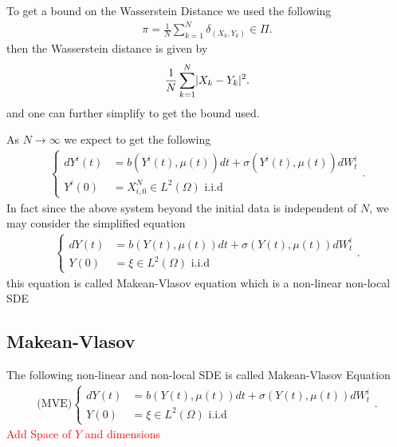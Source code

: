 \begin{remark}
 To get a bound on the Wasserstein Distance we used the following  
  \begin{align*}
    \pi  = \frac{1}{N} \sum_{k=1}^{N} \delta_{(X_k,Y_k)}  \in  \Pi
  .\end{align*}
  then  the Wasserstein distance is given by 
  \begin{align*}
   \frac{1}{N}\sum_{k=1}^{N} \lvert X_k-Y_k\rvert^2  
  .\end{align*}
  and one can further simplify to get the bound used.
\end{remark}
\begin{remark}
  As $N \to \infty$ we expect to get the following 
  \begin{align*}
    \begin{cases}
      dY^{i}(t) &= b(Y^{i}(t) ,\mu(t) ) dt + \sigma(Y^{i}(t),\mu(t) )dW_t^i \\
      Y^{i}(0)  &=  X_{i,0}^{N} \in  L^2(\Omega ) \text{ i.i.d} 
    \end{cases}
  .\end{align*}
  In fact since the above system beyond the initial data is independent of $N$, we may consider the simplified equation
  \begin{align*}
    \begin{cases}
      dY(t) &= b(Y(t) ,\mu(t) ) dt + \sigma(Y(t),\mu(t) )dW_t^i \\
      Y(0)  &=  \xi \in  L^2(\Omega ) \text{ i.i.d} 
    \end{cases}
  .\end{align*}
this equation is called Makean-Vlasov equation which is a non-linear non-local SDE
\end{remark}
\newpage
\subsection{Makean-Vlasov}
\begin{definition}
  The following non-linear and non-local SDE is called Makean-Vlasov Equation 
\begin{align*}
    \text{(MVE)} \begin{cases}
      dY(t) &= b(Y(t) ,\mu(t) ) dt + \sigma(Y(t),\mu(t) )dW_t^i \\
      Y(0)  &=  \xi \in  L^2(\Omega ) \text{ i.i.d} 
    \end{cases}
  .\end{align*}  
\textcolor{Red}{Add Space of $Y$ and dimensions} 
\end{definition}

